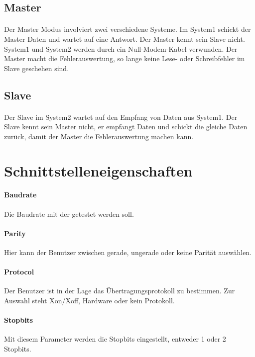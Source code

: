 \subsection{Master}
\paragraph{}
Der Master Modus involviert zwei verschiedene Systeme. Im System1 schickt der Master Daten und wartet auf eine Antwort. Der Master kennt sein Slave nicht. System1 und System2 werden durch ein Null-Modem-Kabel verwunden. Der Master macht die Fehlerauswertung, so lange keine Lese- oder Schreibfehler im Slave geschehen sind.


\subsection{Slave}
\paragraph{}
Der Slave im System2 wartet auf den Empfang von Daten aus System1. Der Slave kennt sein Master nicht, er empfangt Daten und schickt die gleiche Daten zurück, damit der Master die Fehlerauswertung machen kann.


\section{Schnittstelleneigenschaften}

\paragraph{Baudrate} Die Baudrate mit der getestet werden soll.
\paragraph{Parity} Hier kann der Benutzer zwischen gerade, ungerade oder keine Parität auswählen.
\paragraph{Protocol} Der Benutzer ist in der Lage das Übertragungsprotokoll zu bestimmen. Zur Auswahl steht Xon/Xoff, Hardware oder kein Protokoll.
\paragraph{Stopbits} Mit diesem Parameter werden die Stopbits eingestellt, entweder 1 oder 2 Stopbits.
